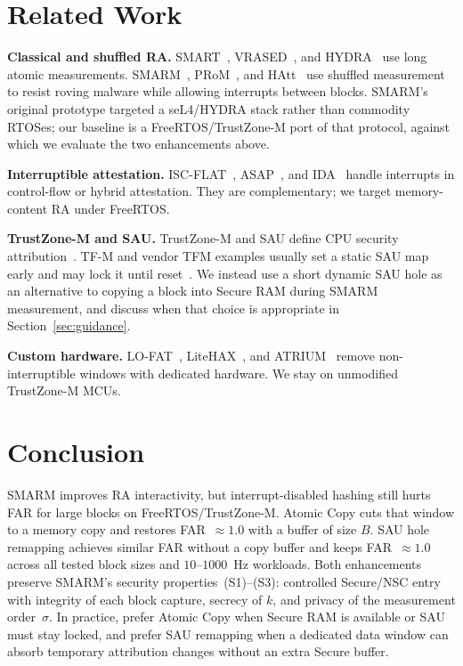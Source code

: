 \documentclass[conference]{IEEEtran}
\begin{document}
\section{Related Work}
\label{sec:related}

\textbf{Classical and shuffled RA.}
SMART~\cite{eldefrawy2012smart}, VRASED~\cite{nunes2019vrased}, and
HYDRA~\cite{eldefrawy2017hydra} use long atomic measurements.
SMARM~\cite{carpent2018smarm}, PRoM~\cite{aman2021prom}, and
HAtt~\cite{aman2018hatt} use shuffled measurement to resist roving
malware while allowing interrupts between blocks. SMARM's original
prototype targeted a seL4/HYDRA stack rather than commodity RTOSes; our
baseline is a FreeRTOS/TrustZone-M port of that protocol, against which
we evaluate the two enhancements above.

\textbf{Interruptible attestation.}
ISC-FLAT~\cite{isc-flat}, ASAP~\cite{asap}, and IDA~\cite{ida2024}
handle interrupts in control-flow or hybrid attestation. They are
complementary; we target memory-content RA under FreeRTOS.

\textbf{TrustZone-M and SAU.}
TrustZone-M and SAU define CPU security
attribution~\cite{trustzone2025,armv8m-arm,an5347,cmsis-tz}. TF-M and
vendor TFM examples usually set a static SAU map early and may lock it
until reset~\cite{tfm2024,tfm-isolation,um2851}. We instead use a short
dynamic SAU hole as an alternative to copying a block into Secure RAM
during SMARM measurement, and discuss when that choice is appropriate
in Section~\ref{sec:guidance}.

\textbf{Custom hardware.}
LO-FAT~\cite{lo-fat}, LiteHAX~\cite{litehax}, and ATRIUM~\cite{atrium}
remove non-interruptible windows with dedicated hardware. We stay on
unmodified TrustZone-M MCUs.

\section{Conclusion}
\label{sec:conclusion}

SMARM improves RA interactivity, but interrupt-disabled hashing still
hurts FAR for large blocks on FreeRTOS/TrustZone-M. Atomic Copy cuts
that window to a memory copy and restores FAR~$\approx 1.0$ with a
buffer of size $B$. SAU hole remapping achieves similar FAR without a
copy buffer and keeps FAR~$\approx 1.0$ across all tested block sizes
and $10$--$1000$~Hz workloads. Both enhancements preserve SMARM's
security properties~(S1)--(S3): controlled Secure/NSC entry with
integrity of each block capture, secrecy of $k$, and privacy of the
measurement order~$\sigma$. In practice, prefer Atomic Copy when
Secure RAM is available or SAU must stay locked, and prefer SAU
remapping when a dedicated data window can absorb temporary  attribution
changes without an extra Secure buffer.



\end{document}
